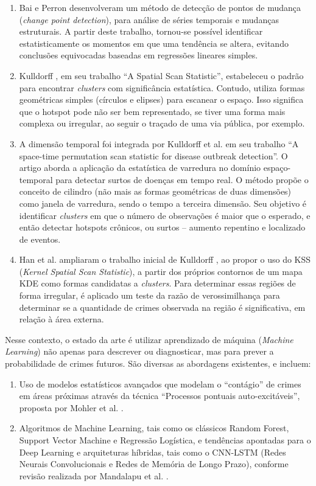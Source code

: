 \begin{enumerate}
  \item{Bai e Perron \cite{BaiAndPerron1998} desenvolveram um método de detecção de pontos de mudança (\textit{change point detection}), para análise de séries temporais e mudanças estruturais. A partir deste trabalho, tornou-se possível identificar estatisticamente os momentos em que uma tendência se altera, evitando conclusões equivocadas baseadas em regressões lineares simples.}
  \item{Kulldorff \cite{Kulldorff1997}, em seu trabalho ``A Spatial Scan Statistic'', estabeleceu o padrão para encontrar \textit{clusters} com significância estatística. Contudo, utiliza formas geométricas simples (círculos e elipses) para escanear o espaço. Isso significa que o hotspot pode não ser bem representado, se tiver uma forma mais complexa ou irregular, ao seguir o traçado de uma via pública, por exemplo.}
  \item{A dimensão temporal foi integrada por Kulldorff et al. \cite{Kulldorff2005} em seu trabalho ``A space-time permutation scan statistic for disease outbreak detection''. O artigo aborda a aplicação da estatística de varredura no domínio espaço-temporal para detectar surtos de doenças em tempo real. O método propõe o conceito de cilindro (não mais as formas geométricas de duas dimensões) como janela de varredura, sendo o tempo a terceira dimensão. Seu objetivo é identificar \textit{clusters} em que o número de observações é maior que o esperado, e então detectar hotspots crônicos, ou surtos -- aumento repentino e localizado de eventos.}
  \item{Han et al. \cite{Han2019} ampliaram o trabalho inicial de Kulldorff \cite{Kulldorff1997}, ao propor o uso do KSS (\textit{Kernel Spatial Scan Statistic}), a partir dos próprios contornos de um mapa KDE como formas candidatas a \textit{clusters}. Para determinar essas regiões de forma irregular, é aplicado um teste da razão de verossimilhança para determinar se a quantidade de crimes observada na região é significativa, em relação à área externa.}
\end{enumerate}

Nesse contexto, o estado da arte é utilizar aprendizado de máquina (\textit{Machine Learning}) não apenas para descrever ou diagnosticar, mas para prever a probabilidade de crimes futuros. São diversas as abordagens existentes, e incluem:

\begin{enumerate}
  \item{Uso de modelos estatísticos avançados que modelam o ``contágio'' de crimes em áreas próximas através da técnica ``Processos pontuais auto-excitáveis'', proposta por Mohler et al. \cite{Mohler2011}.}
  \item{Algoritmos de Machine Learning, tais como os clássicos Random Forest, Support Vector Machine e Regressão Logística, e tendências apontadas para o Deep Learning e arquiteturas híbridas, tais como o CNN-LSTM (Redes Neurais Convolucionais e Redes de Memória de Longo Prazo), conforme revisão realizada por Mandalapu et al. \cite{Mandalapu2023} .}
\end{enumerate}

